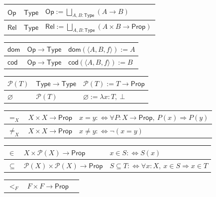 \documentclass[11pt,reqno]{amsart}
\theoremstyle{blueplain}
\numberwithin{equation}{section}
\begin{document}
{	\noindent
	\begin{tabular}{|m{4cm}|m{5cm}|m{9cm}|}
		\hline
		$\mathsf{Op}$ & $\mathsf{Type}$ &
		$\mathsf{Op}:=\bigsqcup_{A,B:\mathsf{Type}}(A\to B)$ \\ \hline
		$\mathsf{Rel}$ & $\mathsf{Type}$ &
		$\mathsf{Rel}:=\bigsqcup_{A,B:\mathsf{Type}}(A\times B\to\mathsf{Prop})$ \\
	\end{tabular}\noindent \newline
	\noindent
	\begin{tabular}{|m{4cm}|m{5cm}|m{9cm}|}
		\hline
		$\mathsf{dom}$ & $\mathsf{Op}\to\mathsf{Type}$ &
		$\mathsf{dom}(\langle A,B,f\rangle):=A$ \\ \hline
		$\mathsf{cod}$ & $\mathsf{Op}\to\mathsf{Type}$ &
		$\mathsf{cod}(\langle A,B,f\rangle):=B$ \\ 
	\end{tabular}\noindent \newline
	\noindent
	\begin{tabular}{|m{4cm}|m{5cm}|m{9cm}|}
		\hline
		$\mathcal{P}(T)$ & $\mathsf{Type}\to\mathsf{Type}$ &
		$\mathcal{P}(T):=T\to\mathsf{Prop}$ \\ \hline
		$\varnothing$ & $\mathcal{P}(T)$ &
		$\varnothing:=\lambda x:T,\ \bot$ \\ 
	\end{tabular}	\noindent \newline	\noindent
	\begin{tabular}{|m{4cm}|m{5cm}|m{9cm}|}
		\hline
		$=_X$ & $X\times X\to\mathsf{Prop}$ &
		$x=y:\iff\forall P:X\to\mathsf{Prop},\ P(x)\Rightarrow P(y)$ \\ \hline
		$\neq_X$ & $X\times X\to\mathsf{Prop}$ &
		$x\neq y:\iff\neg(x=y)$ \\ 
	\end{tabular}	\noindent \newline
	\noindent
	\begin{tabular}{|m{4cm}|m{5cm}|m{9cm}|}
		\hline
		$\in$ & $X\times\mathcal{P}(X)\to\mathsf{Prop}$ &
		$x\in S:\iff S(x)$ \\ \hline
		$\subseteq$ & $\mathcal{P}(X)\times\mathcal{P}(X)\to\mathsf{Prop}$ &
		$S\subseteq T:\iff\forall x:X,\ x\in S\Rightarrow x\in T$ \\ 
	\end{tabular}\noindent \newline
	\noindent
	\begin{tabular}{|m{4cm}|m{5cm}|m{9cm}|}
		\hline
		$<_F$ & $F\times F\to\mathsf{Prop}$ &

\end{tabular}}
\end{document}
